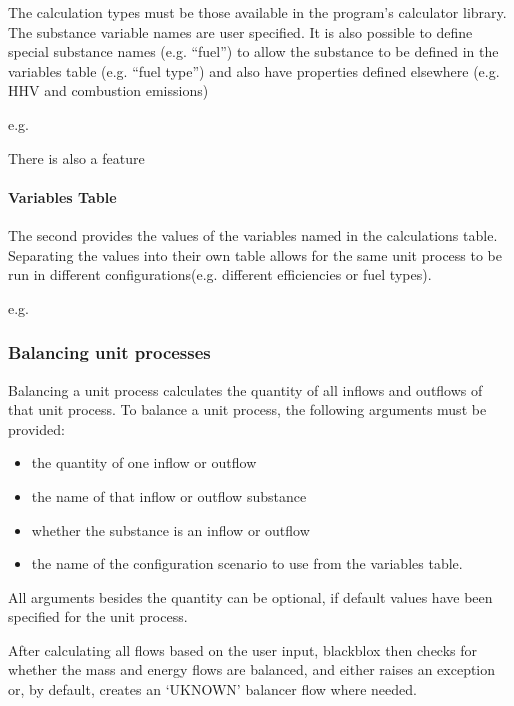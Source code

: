 \documentclass[a4paper,10pt,english]{sphinxmanual}
\begin{document}
The calculation types must be those available in the program’s calculator library. The substance variable names are user specified. It is also possible to define special substance names (e.g. “fuel”) to allow the substance to be defined in the variables table (e.g. “fuel type”) and also have properties defined elsewhere (e.g. HHV and combustion emissions)

e.g.



There is also a feature


\paragraph{Variables Table}
\label{\detokenize{intro:variables-table}}
The second provides the values of the variables named in the calculations table. Separating the values into their own table allows for the same unit process to be run in different configurations(e.g. different efficiencies or fuel types).

e.g.




\subsubsection{Balancing unit processes}
\label{\detokenize{intro:balancing-unit-processes}}
Balancing a unit process calculates the quantity of all inflows and outflows of that unit process. To balance a unit process, the following arguments  must be provided:
\begin{itemize}
\item {} 
the quantity of one inflow or outflow

\item {} 
the name of that inflow or outflow substance

\item {} 
whether the substance is an inflow or outflow

\item {} 
the name of the configuration scenario to use from the variables table.

\end{itemize}

All arguments besides the quantity can be optional, if default values have been specified for the unit process.

After calculating all flows based on the user input, blackblox then checks for whether the mass and energy flows are balanced, and either raises an exception or, by default, creates an ‘UKNOWN’ balancer flow where needed.
\end{document}
